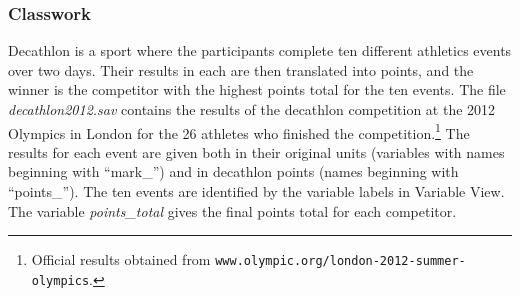 \documentclass[11pt,a4paper,openany]{book}
\let\rmarkdownfootnote\footnote%
\def\footnote{\protect\rmarkdownfootnote}
\begin{document}
\subsubsection*{Classwork}\label{classwork-4}

Decathlon is a sport where the participants complete ten different
athletics events over two days. Their results in each are then
translated into points, and the winner is the competitor with the
highest points total for the ten events. The file
\emph{decathlon2012.sav} contains the results of the decathlon
competition at the 2012 Olympics in London for the 26 athletes who
finished the competition.\footnote{Official results obtained from
  \texttt{www.olympic.org/london-2012-summer-olympics}.} The results for
each event are given both in their original units (variables with names
beginning with ``mark\_'') and in decathlon points (names beginning with
``points\_''). The ten events are identified by the variable labels in
Variable View. The variable \emph{points\_total} gives the final points
total for each competitor.
\end{document}
